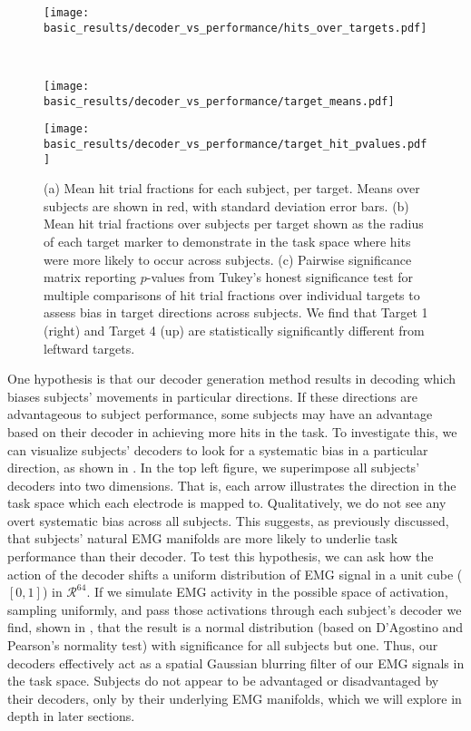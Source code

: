 \documentclass[../main.tex]{subfiles}
\begin{document}
\begin{figure}[!htb]%
    \centering
    \begin{minipage}{1.0\textwidth}
        \texttt{[image: basic\_results/decoder\_vs\_performance/hits\_over\_targets.pdf]}
        \subcaption{}
    \end{minipage}\\%
    \begin{minipage}{0.49\textwidth}
        \texttt{[image: basic\_results/decoder\_vs\_performance/target\_means.pdf]}
      \subcaption{}
    \end{minipage}
    \begin{minipage}{0.49\textwidth}
        \texttt{[image: basic\_results/decoder\_vs\_performance/target\_hit\_pvalues.pdf]}
      \subcaption{}
    \end{minipage}
    \caption[Hits over Targets across subjects]{(a) Mean hit trial fractions for each subject, per target. Means over subjects are shown in red, with standard deviation error bars. (b) Mean hit trial fractions over subjects per target shown as the radius of each target marker to demonstrate in the task space where hits were more likely to occur across subjects. (c) Pairwise significance matrix reporting $p$-values from Tukey's honest significance test for multiple comparisons of hit trial fractions over individual targets to assess bias in target directions across subjects. We find that Target 1 (right) and Target 4 (up) are statistically significantly different from leftward targets.}\label{fig:hits_over_targets}
\end{figure}

One hypothesis is that our decoder generation method results in decoding which biases subjects' movements in particular directions. If these directions are advantageous to subject performance, some subjects may have an advantage based on their decoder in achieving more hits in the task. To investigate this, we can visualize subjects' decoders to look for a systematic bias in a particular direction, as shown in . In the top left figure, we superimpose all subjects' decoders into two dimensions. That is, each arrow illustrates the direction in the task space which each electrode is mapped to. Qualitatively, we do not see any overt systematic bias across all subjects. This suggests, as previously discussed, that subjects' natural EMG manifolds are more likely to underlie task performance than their decoder. To test this hypothesis, we can ask how the action of the decoder shifts a uniform distribution of EMG signal in a unit cube ($[0,1]$) in $\mathcal{R}^{64}$. If we simulate EMG activity in the possible space of activation, sampling uniformly, and pass those activations through each subject's decoder we find, shown in , that the result is a normal distribution (based on D'Agostino and Pearson's normality test) with significance for all subjects but one. Thus, our decoders effectively act as a spatial Gaussian blurring filter of our EMG signals in the task space. Subjects do not appear to be advantaged or disadvantaged by their decoders, only by their underlying EMG manifolds, which we will explore in depth in later sections.
\end{document}

